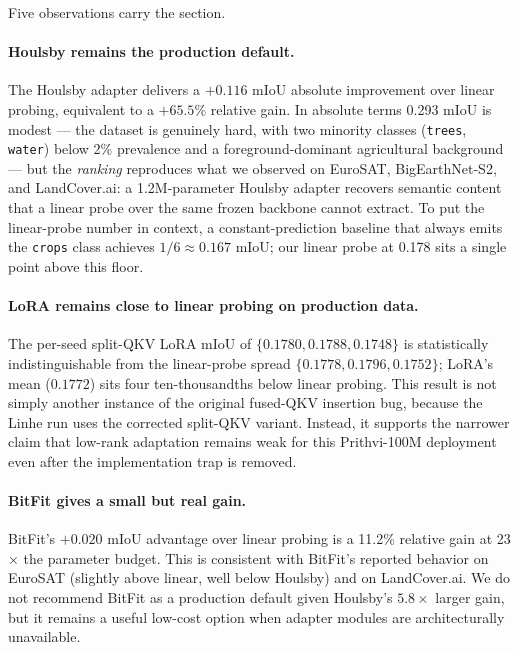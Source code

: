 \documentclass[11pt]{article}
\begin{document}
Five observations carry the section.

\paragraph{Houlsby remains the production default.} The Houlsby adapter delivers a $+0.116$ mIoU absolute improvement over linear probing, equivalent to a $+65.5\%$ relative gain. In absolute terms 0.293 mIoU is modest --- the dataset is genuinely hard, with two minority classes (\texttt{trees}, \texttt{water}) below 2\% prevalence and a foreground-dominant agricultural background --- but the \emph{ranking} reproduces what we observed on EuroSAT, BigEarthNet-S2, and LandCover.ai: a 1.2M-parameter Houlsby adapter recovers semantic content that a linear probe over the same frozen backbone cannot extract. To put the linear-probe number in context, a constant-prediction baseline that always emits the \texttt{crops} class achieves $1/6 \approx 0.167$ mIoU; our linear probe at 0.178 sits a single point above this floor.

\paragraph{LoRA remains close to linear probing on production data.} The per-seed split-QKV LoRA mIoU of $\{0.1780, 0.1788, 0.1748\}$ is statistically indistinguishable from the linear-probe spread $\{0.1778, 0.1796, 0.1752\}$; LoRA's mean ($0.1772$) sits four ten-thousandths below linear probing. This result is not simply another instance of the original fused-QKV insertion bug, because the Linhe run uses the corrected split-QKV variant. Instead, it supports the narrower claim that low-rank adaptation remains weak for this Prithvi-100M deployment even after the implementation trap is removed.

\paragraph{BitFit gives a small but real gain.} BitFit's $+0.020$ mIoU advantage over linear probing is a 11.2\% relative gain at 23$\times$ the parameter budget. This is consistent with BitFit's reported behavior on EuroSAT (slightly above linear, well below Houlsby) and on LandCover.ai. We do not recommend BitFit as a production default given Houlsby's $5.8\times$ larger gain, but it remains a useful low-cost option when adapter modules are architecturally unavailable.
\end{document}

